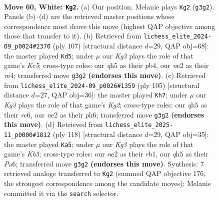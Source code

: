 \documentclass[11pt]{article}
\begin{document}
\clearpage

\begin{figure}[p]\centering
\begin{subfigure}{0.46\textwidth}\centering
\resizebox{\linewidth}{!}{%
\newchessgame
\chessboard[
  setfen={8/p5k1/1p6/7q/P1p5/RP4K1/4n3/8 w - - 2 60},
  showmover=false,
  pgfstyle=straightmove, color=movearrow, markmove={g3-g2}
]}
\caption{}
\end{subfigure}\hfill
\begin{subfigure}{0.46\textwidth}\centering
\resizebox{\linewidth}{!}{%
\newchessgame
\chessboard[
  setfen={8/8/6p1/8/1Pk1Rp1P/6p1/3K2P1/5r2 b - - 5 54},
  showmover=false,
  pgfstyle=straightmove, color=movearrow, markmove={c4-d5}
]}
\caption{}
\end{subfigure}
\\[4pt]
\begin{subfigure}{0.46\textwidth}\centering
\resizebox{\linewidth}{!}{%
\newchessgame
\chessboard[
  setfen={8/6k1/1pR4P/5p2/3P2p1/6P1/1r6/6K1 b - - 0 53},
  showmover=false,
  pgfstyle=straightmove, color=movearrow, markmove={g7-h7}
]}
\caption{}
\end{subfigure}\hfill
\begin{subfigure}{0.46\textwidth}\centering
\resizebox{\linewidth}{!}{%
\newchessgame
\chessboard[
  setfen={8/5pk1/P3p3/1K5R/4P1p1/7P/8/1r6 w - - 1 60},
  showmover=false,
  pgfstyle=straightmove, color=movearrow, markmove={b5-a5}
]}
\caption{}
\end{subfigure}
\caption{\textbf{Move 60, White: \texttt{Kg2}.} (a) Our position; Melanie plays \texttt{Kg2} (\texttt{g3g2}). Panels (b)--(d) are the retrieved master positions whose correspondence most drove this move (highest QAP objective among those that transfer to it). (b) Retrieved from \texttt{lichess\_elite\_2024-09\_p0024\#2370} (ply 107) [structural distance $d$=29, QAP obj=68]: the master played \texttt{Kd5}; under $\mu$ our \emph{Kg3} plays the role of that game's \emph{Kc5}; cross-type roles: our \emph{q}h5 as their \emph{p}b4, our \emph{n}e2 as their \emph{r}e4; transferred move \texttt{g3g2} \textbf{(endorses this move)}. (c) Retrieved from \texttt{lichess\_elite\_2024-09\_p0026\#1359} (ply 105) [structural distance $d$=27, QAP obj=36]: the master played \texttt{Kh7}; under $\mu$ our \emph{Kg3} plays the role of that game's \emph{Kg2}; cross-type roles: our \emph{q}h5 as their \emph{r}c6, our \emph{n}e2 as their \emph{p}h6; transferred move \texttt{g3g2} \textbf{(endorses this move)}. (d) Retrieved from \texttt{lichess\_elite\_2025-11\_p0000\#1812} (ply 118) [structural distance $d$=29, QAP obj=35]: the master played \texttt{Ka5}; under $\mu$ our \emph{Kg3} plays the role of that game's \emph{Kb5}; cross-type roles: our \emph{n}e2 as their \emph{r}b1, our \emph{q}h5 as their \emph{P}a6; transferred move \texttt{g3g2} \textbf{(endorses this move)}. Synthesis: 7 retrieved analogs transferred to \texttt{Kg2} (summed QAP objective 176, the strongest correspondence among the candidate moves); Melanie committed it via the \texttt{search} selector.}
\label{fig:thought-m118}
\end{figure}
\end{document}
